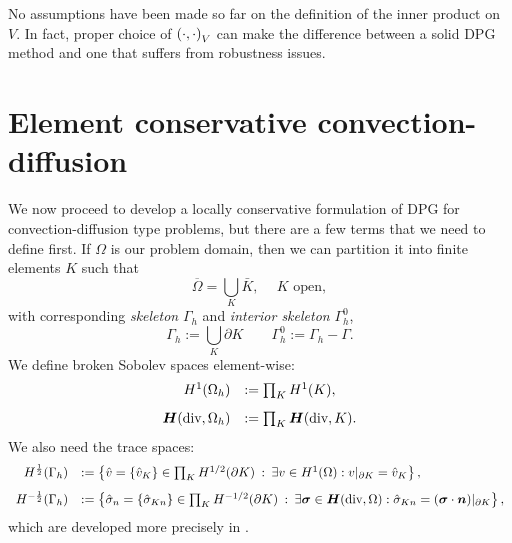 \documentclass[Proposal.tex]{subfiles}
\begin{document}
No assumptions have been made so far on the definition of the inner product on
$V$. In fact, proper choice of $\left( \cdot,\cdot \right)_V$ can make the difference
between a solid DPG method and one that suffers from robustness issues.

%                                                                                                                     
%                                                                                                                     
%                                                                                                                     
\section{Element conservative convection-diffusion}
We now proceed to develop a locally conservative formulation of DPG for
convection-diffusion type problems, but there are a few terms that we need to
define first. If $\Omega$ is our problem domain, then we can partition it into
finite elements $K$ such that
\[
\overline{\Omega} = \bigcup_K  \bar{K},\: \quad K \text { open},
\]
with corresponding {\em skeleton} $\Gamma_h$ and {\em interior
  skeleton} $\Gamma_h^0$,
\[
\Gamma_h := \bigcup_K \partial K\qquad \Gamma_h^0 := \Gamma_h - \Gamma.
\]
We define broken Sobolev spaces element-wise:
\[
\begin{array}{rl}
H^1(\Omega_h) & := \prod_K H^1(K), \\[8pt]
\mbox{\boldmath $H$}(\text{div},\Omega_h) & := \prod_K \mbox{\boldmath $H$}(\text{div},K).
\end{array}
\]
We also need the trace spaces:
\[
\begin{array}{rl}
H^\frac{1}{2}(\Gamma_h) & := \left\{ \hat{v} = \{\hat{v}_K \} \in \prod_K H^{1/2}(\partial K) \: :
\: \exists v \in H^1(\Omega) : v|_{\partial K} = \hat{v}_K \right\}, \\[8pt]
H^{-\frac{1}{2}}(\Gamma_h) & := \left\{ {\hat{\sigma}}_n = \{ {\hat{\sigma}}_{Kn} \}\in \prod_K H^{-1/2}(\partial K) \: : \: \exists \boldsymbol\sigma \in \mbox{\boldmath $H$}(\text{div},\Omega)
: {\hat{\sigma}}_{Kn} = (\boldsymbol\sigma \cdot \boldsymbol n)|_{\partial K} \right\},
\end{array}
\]
which are developed more precisely in \cite{DPGStokes}.
\end{document}
